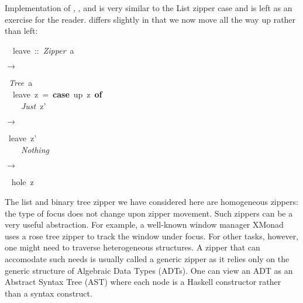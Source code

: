 \documentclass[runningheads]{llncs}
\newcommand{\texfamily}{\fontfamily{cmtex}\selectfont}
\newcommand{\WithMath}[2]{{\parbox{\widthof{#1}}{\centering$#2$}}}
\begin{document}
  Implementation of , , and  is very similar to the
  List zipper case and is left as an exercise for the reader.  differs
  slightly in that we now move all the way up rather than left:
\begin{hscode}\SaveRestoreHook
~~leave~::~{\itshape Zipper}~a~\WithMath{->}{\rightarrow}~{\itshape Tree}~a
\\
\texfamily ~~leave~z~=~{\bfseries case}~up~z~{\bfseries of}
\\
\texfamily ~~~~{\itshape Just}~z'~\WithMath{->}{\rightarrow}~leave~z'
\\
\texfamily ~~~~{\itshape Nothing}~\WithMath{->}{\rightarrow}~ hole~z
\ColumnHook
\end{hscode}\resethooks


  The list and binary tree zipper we have considered here are homogeneous
  zippers: the type of focus does not change upon zipper movement. Such zippers
  can be a very useful abstraction. For example, a well-known window manager
  XMonad\cite{xmonad} uses a rose tree zipper to track the window under focus.
  For other tasks, however, one might need to traverse heterogeneous structures.
  A zipper that can accomodate such needs is usually called a generic zipper as
  it relies only on the generic structure of Algebraic Data Types (ADTs). One
  can view an ADT as an Abstract Syntax Tree (AST) where each node is a Haskell
  constructor rather than a syntax construct.
\end{document}
